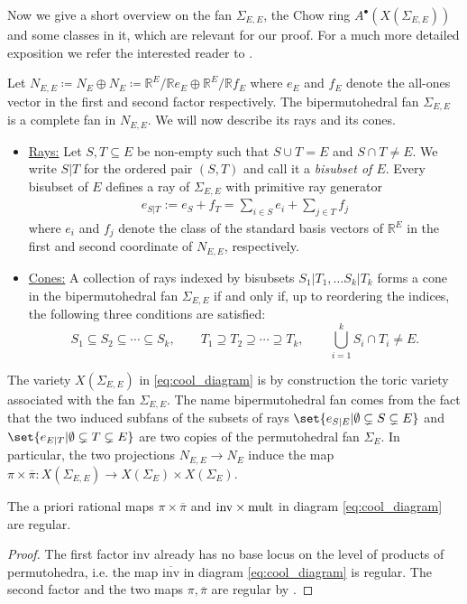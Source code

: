 \documentclass[12pt,a4paper,english]{scrartcl}
\newcommand{\RR}{\mathbb{R}}
\begin{document}
Now we give a short overview on the fan $\Sigma_{E,E}$, the Chow ring $A^\bullet(X(\Sigma_{E,E}))$ and some classes in it, which are relevant for our proof. For a much more detailed exposition we refer the interested reader to \cite{Ardila2022}.

Let $N_{E,E}\coloneq N_E\oplus N_E\coloneq \RR^E/\RR  e_E\oplus \RR^E/\RR f_E $ where $ e_E$ and $f_E$ denote the all-ones vector in the first and second factor respectively. The bipermutohedral fan $\Sigma_{E,E}$ is a complete fan in $N_{E,E}$. We will now describe its rays and its cones. 
\begin{itemize}
\item \underline{Rays:} Let $S,T\subseteq E$ be non-empty such that $S\cup T=E$ and $S\cap T\neq E$. We write $S|T$ for the ordered pair $(S,T)$ and call it a \emph{bisubset of $E$}.  Every bisubset of $E$ defines a ray of $\Sigma_{E,E}$ with primitive ray generator \begin{align*}
     e_{S|T}:= e_S+f_T=\sum_{i\in S} e_i+\sum_{j\in T}f_j 
\end{align*}
where $ e_i$ and $f_j$ denote the class of the standard basis vectors of $\RR^E$ in the first and second coordinate of $N_{E,E}$, respectively.
\item \underline{Cones:} A collection of rays indexed by bisubsets $S_1|T_1,\ldots S_k|T_k$ forms a cone in the bipermutohedral fan $\Sigma_{E,E}$ if and only if, up to reordering the indices, the following three conditions are satisfied:
\[
S_1\subseteq S_2\subseteq \cdots \subseteq S_k, \qquad T_1\supseteq T_2\supseteq \cdots \supseteq T_k, \qquad \bigcup_{i=1}^kS_i\cap T_i \neq E.
\]
\end{itemize}
The variety $X(\Sigma_{E,E})$ in \eqref{eq:cool_diagram} is by construction the toric variety associated with the fan $\Sigma_{E,E}$. The name bipermutohedral fan comes from the fact that the two induced subfans of the subsets of rays $\set{e_{S\vert E}|\emptyset \subsetneq S \subsetneq E}$ and   $\set{e_{E\vert T}|\emptyset \subsetneq T \subsetneq E}$ are two copies of the permutohedral fan $\Sigma_E$. In particular, the two projections $N_{E,E}\to N_E$ induce the map $\pi\times \overline{\pi}\colon X(\Sigma_{E,E})\to X(\Sigma_E)\times X(\Sigma_E)$.  
\begin{lemma}
    The a priori rational maps $\pi\times \overline{\pi}$ and $\textup{inv}\times \textup{mult}$ in diagram \eqref{eq:cool_diagram} are regular.
\end{lemma}
\begin{proof}
    The first factor $\text{inv}$ already has no base locus on the level of products of permutohedra, i.e. the map $\overline{\text{inv}}$ in diagram \eqref{eq:cool_diagram} is regular. The second factor and the two maps $\pi,\overline{\pi}$ are regular by \cite[Proposition 2.11]{Ardila2022}.
\end{proof}
\end{document}
